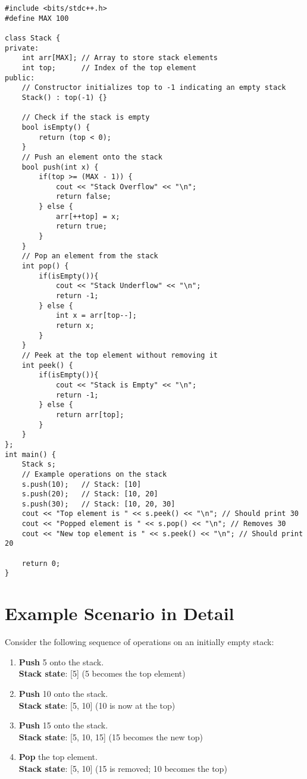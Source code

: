 \begin{lstlisting}[caption={C++ implementation of a Stack using an array}]
#include <bits/stdc++.h>
#define MAX 100

class Stack {
private:
    int arr[MAX]; // Array to store stack elements
    int top;      // Index of the top element
public:
    // Constructor initializes top to -1 indicating an empty stack
    Stack() : top(-1) {}

    // Check if the stack is empty
    bool isEmpty() {
        return (top < 0);
    }
    // Push an element onto the stack
    bool push(int x) {
        if(top >= (MAX - 1)) {
            cout << "Stack Overflow" << "\n";
            return false;
        } else {
            arr[++top] = x;
            return true;
        }
    }
    // Pop an element from the stack
    int pop() {
        if(isEmpty()){
            cout << "Stack Underflow" << "\n";
            return -1;
        } else {
            int x = arr[top--];
            return x;
        }
    }
    // Peek at the top element without removing it
    int peek() {
        if(isEmpty()){
            cout << "Stack is Empty" << "\n";
            return -1;
        } else {
            return arr[top];
        }
    }
};
int main() {
    Stack s;
    // Example operations on the stack
    s.push(10);   // Stack: [10]
    s.push(20);   // Stack: [10, 20]
    s.push(30);   // Stack: [10, 20, 30]
    cout << "Top element is " << s.peek() << "\n"; // Should print 30
    cout << "Popped element is " << s.pop() << "\n"; // Removes 30
    cout << "New top element is " << s.peek() << "\n"; // Should print 20

    return 0;
}
\end{lstlisting}

\section{Example Scenario in Detail}
Consider the following sequence of operations on an initially empty stack:
\begin{enumerate}
    \item \textbf{Push} 5 onto the stack. \\
          \textbf{Stack state}: [5] (5 becomes the top element)
    \item \textbf{Push} 10 onto the stack. \\
          \textbf{Stack state}: [5, 10] (10 is now at the top)
    \item \textbf{Push} 15 onto the stack. \\
          \textbf{Stack state}: [5, 10, 15] (15 becomes the new top)
    \item \textbf{Pop} the top element. \\
          \textbf{Stack state}: [5, 10] (15 is removed; 10 becomes the top)
\end{enumerate}

